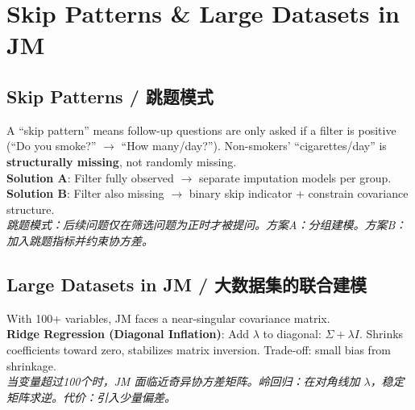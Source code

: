 \documentclass[9pt, a4paper]{article}
\begin{document}
\section{Skip Patterns \& Large Datasets in JM}

\subsection{Skip Patterns / 跳题模式}
\begin{tcolorbox}[defbox]
    A ``skip pattern'' means follow-up questions are only asked if a filter is positive (``Do you smoke?'' $\to$ ``How many/day?''). Non-smokers' ``cigarettes/day'' is \textbf{structurally missing}, not randomly missing.\\[3pt]
    \textbf{Solution A}: Filter fully observed $\to$ separate imputation models per group.\\
    \textbf{Solution B}: Filter also missing $\to$ binary skip indicator + constrain covariance structure.\\
    \textit{跳题模式：后续问题仅在筛选问题为正时才被提问。方案A：分组建模。方案B：加入跳题指标并约束协方差。}
\end{tcolorbox}

\subsection{Large Datasets in JM / 大数据集的联合建模}
\begin{tcolorbox}[defbox]
    With 100+ variables, JM faces a near-singular covariance matrix.\\[3pt]
    \textbf{Ridge Regression (Diagonal Inflation)}: Add $\lambda$ to diagonal: $\Sigma + \lambda I$. Shrinks coefficients toward zero, stabilizes matrix inversion. Trade-off: small bias from shrinkage.\\
    \textit{当变量超过100个时，JM 面临近奇异协方差矩阵。岭回归：在对角线加 $\lambda$，稳定矩阵求逆。代价：引入少量偏差。}
\end{tcolorbox}
\end{document}

